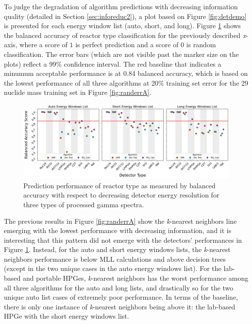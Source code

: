 
To judge the degradation of algorithm predictions with decreasing information
quality (detailed in Section \ref{sec:inforeduc2}), a plot based on Figure
\ref{fig:detdemo} is presented for each energy window list (auto, short, and
long).  Figure \ref{fig:rxtr} shows the balanced accuracy of reactor type
classification for the previously described \textit{x}-axis, where a score of
$1$ is perfect prediction and a score of $0$ is random classification. The
error bars (which are not visible past the marker size on the plots) reflect a
99\% confidence interval.  The red baseline that indicates a minumum acceptable
performance is at 0.84 balanced accuracy, which is based on the lowest
performance of all three algorithms at 20\% training set error for the 29
nuclide mass training set in Figure \ref{fig:randerrA}.  

\begin{figure}[!htb]
  \centering
  \includegraphics[width=\textwidth]{./chapters/exp2/detector_preds_wrt_enlist_BalAcc_rxtr.png}
  \caption{Prediction performance of reactor type as measured by balanced 
           accuracy with respect to decreasing detector energy resolution 
           for three types of processed gamma spectra.}
  \label{fig:rxtr}
\end{figure}

The previous results in Figure \ref{fig:randerrA} show the \textit{k}-nearest
neighbors line emerging with the lowest performance with decreasing
information, and it is interesting that this pattern did not emerge with the
detectors' performances in Figure \ref{fig:rxtr}.  Instead, for the auto and
short energy windows lists, the \textit{k}-nearest neighbors performance is
below \gls{MLL} calculations and above decision trees (except in the two unique
cases in the auto energy windows list).  For the lab-based and portable
\gls{HPGe}s, \textit{k}-nearest neighbors has the worst performance among all
three algorithms for the auto and long lists, and drastically so for the two
unique auto list cases of extremely poor performance.  In terms of the
baseline, there is only one instance of \textit{k}-nearest neighbors being
above it: the lab-based \gls{HPGe} with the short energy windows list. 

